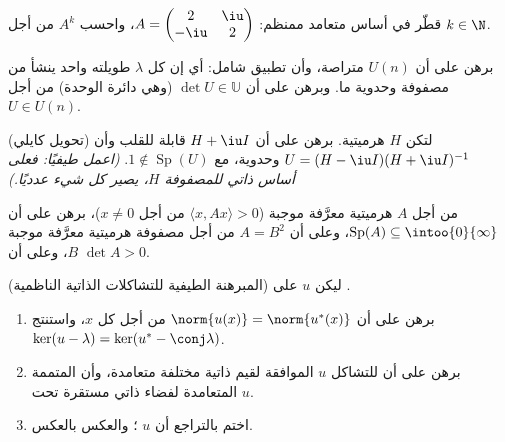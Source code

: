 \begin{exercise}[$\star\star$]\label{exo:b2:hermitian:4}
قطّر في أساس متعامد ممنظم: $A = \begin{pmatrix} 2 & \iu\\
-\iu & 2\end{pmatrix}$، واحسب $A^k$ من أجل $k \in \N$.
\end{exercise}

\begin{exercise}[$\star\star$]\label{exo:b2:hermitian:5}
برهن على أن $U(n)$ متراصة، وأن تطبيق 
شامل: أي إن كل $\lambda$ طويلته واحد ينشأ من مصفوفة وحدوية ما.
وبرهن على أن $\det U \in \mathbb{U}$ (وهي دائرة الوحدة) من أجل $U \in
U(n)$.
\end{exercise}

\begin{exercise}[$\star\star$]\label{exo:b2:hermitian:6}
(تحويل كايلي) لتكن $H$ هرميتية. برهن على أن $H + \iu I$
قابلة للقلب وأن $U = (H - \iu I)(H + \iu I)^{-1}$ وحدوية،
مع $1 \notin \operatorname{Sp}(U)$. \emph{(اعمل طيفيًا: فعلى
أساس ذاتي للمصفوفة $H$، يصير كل شيء عدديًا.)}
\end{exercise}

\begin{exercise}[$\star\star$]\label{exo:b2:hermitian:7}
من أجل $A$ هرميتية معرَّفة موجبة ($\langle x, Ax\rangle > 0$ من أجل
$x \neq 0$)، برهن على أن $\operatorname{Sp}(A) \subseteq
\intoo{0}{\infty}$، وعلى أن $A = B^2$ من أجل مصفوفة هرميتية معرَّفة
موجبة $B$، وعلى أن $\det A > 0$.
\end{exercise}

\begin{exercise}[$\star\star\star$]\label{exo:b2:hermitian:8}
(المبرهنة الطيفية للتشاكلات الذاتية الناظمية) ليكن $u$  على
.
\begin{enumerate}
  \item برهن على أن $\norm{u(x)} = \norm{u^*(x)}$ من أجل كل $x$، واستنتج
        $\ker(u - \lambda) = \ker(u^* - \conj\lambda)$.
  \item برهن على أن  للتشاكل $u$ الموافقة لقيم ذاتية مختلفة
        متعامدة، وأن المتممة المتعامدة لفضاء ذاتي
        مستقرة تحت $u$.
  \item اختم بالتراجع أن $u$  ؛
        والعكس بالعكس.
\end{enumerate}
\end{exercise}

